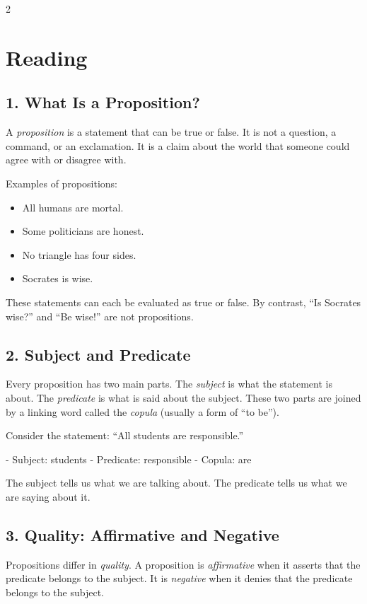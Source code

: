 \documentclass[12pt]{article}
\begin{document}
\begin{multicols}{2}
\section*{Reading}

\subsection*{1. What Is a Proposition?}
A \textit{proposition} is a statement that can be true or false. It is not a question, a command, or an exclamation. It is a claim about the world that someone could agree with or disagree with.

Examples of propositions:
\begin{itemize}
\item All humans are mortal.
\item Some politicians are honest.
\item No triangle has four sides.
\item Socrates is wise.
\end{itemize}

These statements can each be evaluated as true or false. By contrast, “Is Socrates wise?” and “Be wise!” are not propositions.

\subsection*{2. Subject and Predicate}
Every proposition has two main parts. The \textit{subject} is what the statement is about. The \textit{predicate} is what is said about the subject. These two parts are joined by a linking word called the \textit{copula} (usually a form of “to be”).

Consider the statement: “All students are responsible.”

- Subject: students
- Predicate: responsible
- Copula: are

The subject tells us what we are talking about. The predicate tells us what we are saying about it.

\subsection*{3. Quality: Affirmative and Negative}
Propositions differ in \textit{quality}. A proposition is \textit{affirmative} when it asserts that the predicate belongs to the subject. It is \textit{negative} when it denies that the predicate belongs to the subject.


\end{multicols}
\end{document}
